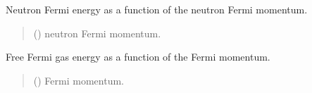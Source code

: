 \documentclass[letterpaper,10pt,english]{sphinxmanual}
\begin{document}

\begin{fulllineitems}
\label{\detokenize{source/api/setup_eos_ffg:nucleardatapy.setup_eos_ffg.eF_n}}
\pysigstartsignatures
\pysiglinewithargsret
{}
{}
{}
\pysigstopsignatures
\sphinxAtStartPar
Neutron Fermi energy as a function of the neutron Fermi momentum.
\begin{quote}\begin{description}
\sphinxAtStartPar
{} () \textendash{} neutron Fermi momentum.

\end{description}\end{quote}

\end{fulllineitems}


\begin{fulllineitems}
\label{\detokenize{source/api/setup_eos_ffg:nucleardatapy.setup_eos_ffg.effg}}
\pysigstartsignatures
\pysiglinewithargsret
{}
{}
{}
\pysigstopsignatures
\sphinxAtStartPar
Free Fermi gas energy as a function of the Fermi momentum.
\begin{quote}\begin{description}
\sphinxAtStartPar
{} () \textendash{} Fermi momentum.

\end{description}\end{quote}

\end{fulllineitems}
\end{document}
